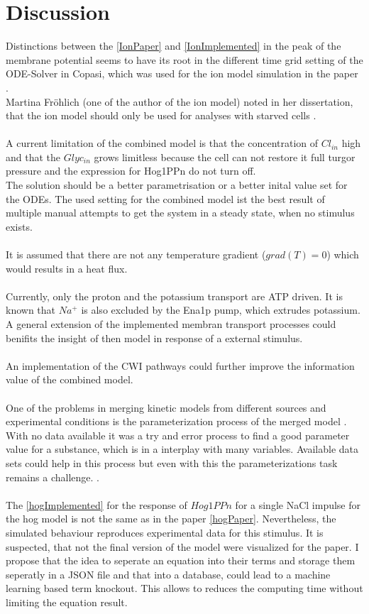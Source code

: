 \section{Discussion}
Distinctions between the \ref{IonPaper} and \ref{IonImplemented} in the peak of the membrane potential seems to have its root in the different time grid setting of the ODE-Solver in Copasi, which was used for the ion model simulation in the paper \cite{Gerber_2016}.\\
Martina Fröhlich (one of the author of the ion model) noted in her dissertation, that the ion model should only be used for analyses with starved cells \cite{martinafroehlich}.\\\\
A current limitation of the combined model is that the concentration of $Cl_{in}$ high and that the $Glyc_{in}$ grows limitless because the cell can not restore it full turgor pressure and the expression for Hog1PPn do not turn off.\\ The solution should be a better parametrisation or a better inital value set for the ODEs. The used setting for the combined model ist the best result of multiple manual attempts to get the system in a steady state, when no stimulus exists. \\\\
It is assumed that there are not any temperature gradient ($grad(T)=0$) which would results in a heat flux.\\\\
Currently, only the proton and the potassium transport are ATP driven. It is known that $Na^+$ is also excluded by the Ena1p pump, which extrudes potassium. A general extension of the implemented membran transport processes could benifits the insight of then model in response of a external stimulus.\\\\
An implementation of the CWI pathways could further improve the information value of the combined model.\\\\
One of the problems in merging kinetic models from different sources and experimental conditions is the parameterization process of the merged model \cite{Wang2017}. With no data available it was a try and error process to find a good parameter value for a substance, which is in a interplay with many variables. Available data sets could help in this process but even with this the parameterizations task remains a challenge. \cite{Ke_2013}. \\\\
The  \ref{hogImplemented} for the response of $Hog1PPn$ for a single NaCl impulse for the hog model is not the same as in the paper \ref{hogPaper}. Nevertheless, the simulated behaviour reproduces experimental data for this stimulus. It is suspected, that not the final version of the model were visualized for the paper.
I propose that the idea to seperate an equation into their terms and storage them seperatly in a JSON file and that into a database, could lead to a machine learning based term knockout. This allows to reduces the computing time without limiting the equation result.\\

